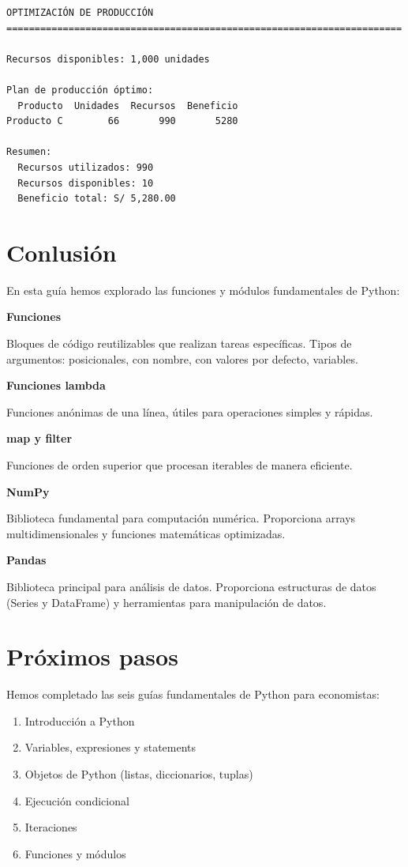 \documentclass[
  doc,
  floatsintext,
  longtable,
  a4paper,
  nolmodern,
  notxfonts,
  notimes,
  12pt,
  colorlinks=true,linkcolor=blue,citecolor=blue,urlcolor=blue]{apa7}
\providecommand{\tightlist}{%
  \setlength{\itemsep}{0pt}\setlength{\parskip}{0pt}}
\begin{document}
\begin{verbatim}
OPTIMIZACIÓN DE PRODUCCIÓN
======================================================================

Recursos disponibles: 1,000 unidades

Plan de producción óptimo:
  Producto  Unidades  Recursos  Beneficio
Producto C        66       990       5280

Resumen:
  Recursos utilizados: 990
  Recursos disponibles: 10
  Beneficio total: S/ 5,280.00
\end{verbatim}

\section{Conlusión}\label{conlusiuxf3n}

En esta guía hemos explorado las funciones y módulos fundamentales de
Python:

\textbf{Funciones}

Bloques de código reutilizables que realizan tareas específicas. Tipos
de argumentos: posicionales, con nombre, con valores por defecto,
variables.

\textbf{Funciones lambda}

Funciones anónimas de una línea, útiles para operaciones simples y
rápidas.

\textbf{map y filter}

Funciones de orden superior que procesan iterables de manera eficiente.

\textbf{NumPy}

Biblioteca fundamental para computación numérica. Proporciona arrays
multidimensionales y funciones matemáticas optimizadas.

\textbf{Pandas}

Biblioteca principal para análisis de datos. Proporciona estructuras de
datos (Series y DataFrame) y herramientas para manipulación de datos.

\section{Próximos pasos}\label{pruxf3ximos-pasos}

Hemos completado las seis guías fundamentales de Python para
economistas:

\begin{enumerate}
\def\labelenumi{\arabic{enumi}.}
\tightlist
\item
  Introducción a Python
\item
  Variables, expresiones y statements
\item
  Objetos de Python (listas, diccionarios, tuplas)
\item
  Ejecución condicional
\item
  Iteraciones
\item
  Funciones y módulos
\end{enumerate}
\end{document}
